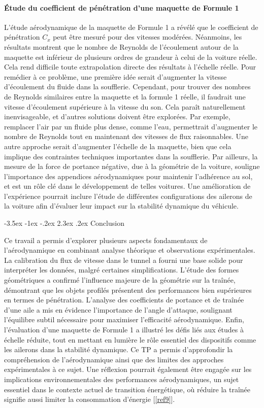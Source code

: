\documentclass[a4paper, 12pt,oneside]{article}
\makeatletter
\renewcommand{\section}{\@startsection {section}{1}{\z@}%
             {-3.5ex \@plus -1ex \@minus -.2ex}%
             {2.3ex \@plus.2ex}%
             {\normalfont\normalsize\bfseries}}
\makeatother
\begin{document}
\paragraph{Étude du coefficient de pénétration d’une maquette de Formule 1}

L’étude aérodynamique de la maquette de Formule 1 a révélé que le coefficient de pénétration $C_x$ peut être mesuré pour des vitesses modérées. Néanmoins, les résultats montrent que le nombre de Reynolds de l’écoulement autour de la maquette est inférieur de plusieurs ordres de grandeur à celui de la voiture réelle. Cela rend difficile toute extrapolation directe des résultats à l’échelle réelle. Pour remédier à ce problème, une première idée serait d'augmenter la vitesse d'écoulement du fluide dans la soufflerie. Cependant, pour trouver des nombres de Reynolds similaires entre la maquette et la formule 1 réelle, il faudrait une vitesse d'écoulement supérieure à la vitesse du son. Cela paraît naturellement inenvisageable, et d'autres solutions doivent être explorées. Par exemple, remplacer l’air par un fluide plus dense, comme l’eau, permettrait d’augmenter le nombre de Reynolds tout en maintenant des vitesses de flux raisonnables. Une autre approche serait d’augmenter l’échelle de la maquette, bien que cela implique des contraintes techniques importantes dans la soufflerie. Par ailleurs, la mesure de la force de portance négative, due à la géométrie de la voiture, souligne l’importance des appendices aérodynamiques pour maintenir l’adhérence au sol, et est un rôle clé dans le développement de telles voitures. Une amélioration de l’expérience pourrait inclure l’étude de différentes configurations des ailerons de la voiture afin d'évaluer leur impact sur la stabilité dynamique du véhicule.

\section{Conclusion}

Ce travail a permis d’explorer plusieurs aspects fondamentaux de l’aérodynamique en combinant analyse théorique et observations expérimentales. La calibration du flux de vitesse dans le tunnel a fourni une base solide pour interpréter les données, malgré certaines simplifications. L’étude des formes géométriques a confirmé l’influence majeure de la géométrie sur la traînée, démontrant que les objets profilés présentent des performances bien supérieures en termes de pénétration. L’analyse des coefficients de portance et de traînée d’une aile a mis en évidence l’importance de l’angle d’attaque, soulignant l’équilibre subtil nécessaire pour maximiser l’efficacité aérodynamique. Enfin, l’évaluation d’une maquette de Formule 1 a illustré les défis liés aux études à échelle réduite, tout en mettant en lumière le rôle essentiel des dispositifs comme les ailerons dans la stabilité dynamique. Ce TP a permis d'approfondir la compréhension de l'aérodynamique ainsi que des limites des approches expérimentales à ce sujet. Une réflexion pourrait également être engagée sur les implications environnementales des performances aérodynamiques, un sujet essentiel dans le contexte actuel de transition énergétique, où réduire la traînée signifie aussi limiter la consommation d’énergie [\ref{ref9}].
\end{document}
